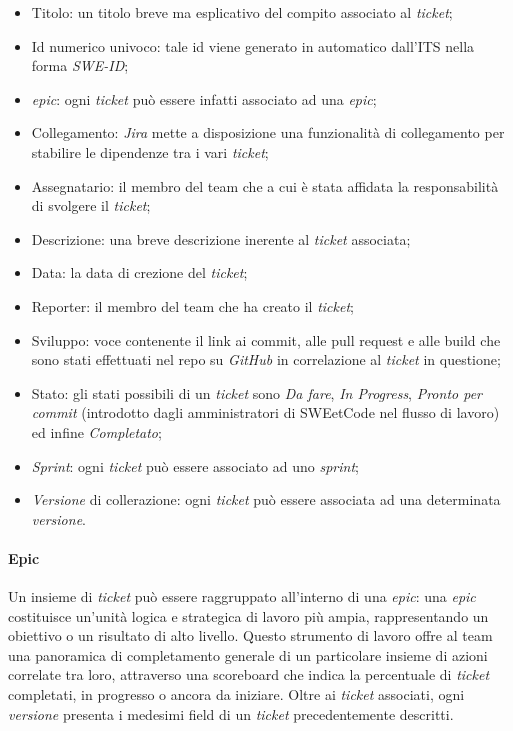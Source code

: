 \documentclass[10pt, a4paper]{article}
\begin{document}
\begin{itemize}
    \item Titolo: un titolo breve ma esplicativo del compito associato al \textit{ticket};
    \item Id numerico univoco: tale id viene generato in automatico dall'ITS nella forma \textit{SWE-ID};
    \item \textit{epic}: ogni \textit{ticket} può essere infatti associato ad una \textit{epic};
    \item Collegamento: \textit{Jira} mette a disposizione una funzionalità di collegamento per stabilire le dipendenze tra i vari \textit{ticket};
    \item Assegnatario: il membro del team che a cui è stata affidata la responsabilità di svolgere il \textit{ticket};
    \item Descrizione: una breve descrizione inerente al \textit{ticket} associata;
    \item Data: la data di crezione del \textit{ticket};
    \item Reporter: il membro del team che ha creato il \textit{ticket};
    \item Sviluppo: voce contenente il link ai commit, alle pull request e alle build che sono stati effettuati nel repo su \textit{GitHub} in correlazione al \textit{ticket} in questione;
    \item Stato: gli stati possibili di un \textit{ticket} sono \textit{Da fare}, \textit{In Progress}, \textit{Pronto per commit} (introdotto dagli amministratori di SWEetCode nel flusso di lavoro) ed infine \textit{Completato};
    \item \textit{Sprint}: ogni \textit{ticket} può essere associato ad uno \textit{sprint};
    \item \textit{Versione} di collerazione: ogni \textit{ticket} può essere associata ad una determinata \textit{versione}.
\end{itemize}

\paragraph{Epic}
Un insieme di \textit{ticket} può essere raggruppato all'interno di una \textit{epic}: una \textit{epic} costituisce un'unità 
logica e strategica di lavoro più ampia, rappresentando un obiettivo o un risultato di alto livello. Questo strumento di lavoro offre
al team una panoramica di completamento generale di un particolare insieme di azioni correlate tra loro, attraverso una 
scoreboard che indica la percentuale di \textit{ticket} completati, in progresso o ancora da iniziare.
Oltre ai \textit{ticket} associati, ogni \textit{versione} presenta i medesimi field di un \textit{ticket} precedentemente descritti.
\end{document}
